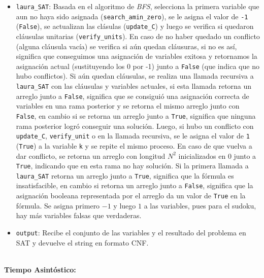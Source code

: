 \documentclass[letterpaper,12pt]{article}
\begin{document}
\begin{itemize}
	\item \texttt{laura\_SAT}: Basada en el algoritmo de \textit{BFS}, selecciona la primera variable que aun no haya sido asignada (\texttt{search\_amin\_zero}), se le asigna el valor de \texttt{-1} (\texttt{False}), se actualizan las clásulas (\texttt{update\_C}) y luego se verifica si quedaron cláusulas unitarias (\texttt{verify\_units}). En caso de no haber quedado un conflicto (alguna cláusula vacía) se verifica si a\'un quedan cl\'ausuras, si no es as\'i, significa que conseguimos una asignaci\'on de variables exitosa y retornamos la asignaci\'on actual (sustituyendo los 0 por -1) junto a \texttt{False} (que indica que no hubo conflictos). Si a\'un quedan cl\'ausulas, se realiza una llamada recursiva a \texttt{laura\_SAT} con las cl\'ausulas y variables actuales, si esta llamada retorna un arreglo junto a \texttt{False}, significa que se consigui\'o una asignaci\'on correcta de variables en una rama posterior y se retorna el mismo arreglo junto con \texttt{False}, en cambio si se retorna un arreglo junto a \texttt{True}, significa que ninguna rama posterior logr\'o conseguir una soluci\'on. Luego, si hubo un conflicto con \texttt{update\_C}, \texttt{verify\_unit} o en la llamada recursiva, se le asigna el valor de \texttt{1} (\texttt{True}) a la variable \texttt{k} y se repite el mismo proceso. En caso de que vuelva a dar conflicto, se retorna un arreglo con longitud $N^2$ inicializados en 0 junto a \texttt{True}, indicando que en esta rama no hay soluci\'on. Si la primera llamada a \texttt{laura\_SAT} retorna un arreglo junto a \texttt{True}, significa que la f\'ormula es insatisfacible, en cambio si retorna un arreglo junto a \texttt{False}, significa que la asignaci\'on booleana representada por el arreglo da un valor de \texttt{True} en la f\'ormula. Se asigna primero $-1$ y luego $1$ a las variables, pues para el sudoku, hay m\'as variables falsas que verdaderas.
	

	\item \texttt{output}: Recibe el conjunto de las variables y el resultado del problema en SAT y devuelve el string en formato CNF. \\ \\
\end{itemize}

\textbf{Tiempo Asintóstico:}
\end{document}
